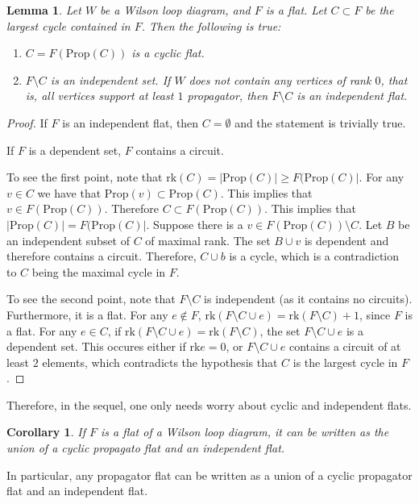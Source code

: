 \documentclass[11pt]{article}
\newcommand{\rk}{\textrm{rk}}
\newcommand{\Prop}{\textrm{Prop}}
\newtheorem{lem}[thm]{Lemma}
\newtheorem{cor}[thm]{Corollary}
\theoremstyle{remark}
\theoremstyle{definition}
\begin{document}
\begin{lem} Let $W$ be a Wilson loop diagram, and $F$ is a flat. Let $C \subset F$ be the largest cycle contained in $F$. Then the following is true:
\begin{enumerate}
\item $C = F(\Prop (C))$ is a cyclic flat.
\item $F \setminus C$ is an independent set. If $W$ does not contain any vertices of rank $0$, that is, all vertices support at least $1$ propagator, then $F \setminus C$ is an independent flat.
\end{enumerate}
\end{lem}

\begin{proof}
If $F$ is an independent flat, then $C = \emptyset$ and the statement is trivially true.

If $F$ is a dependent set, $F$ contains a circuit.

To see the first point, note that $\rk(C) = |\Prop(C)| \geq F(\Prop (C)|$.  For any $v\in C$ we have that $\Prop(v) \subset \Prop(C)$. This implies that $v \in F(\Prop(C))$. Therefore $C \subset F(\Prop(C))$. This implies that $|\Prop(C)| = F(\Prop (C)|$. Suppose there is a $v \in  F(\Prop(C)) \setminus C$. Let $B$ be an independent subset of $C$ of maximal rank. The set $B \cup v$ is dependent and therefore contains a circuit. Therefore, $C \cup b$ is a cycle, which is a contradiction to $C$ being the maximal cycle in $F$.

To see the second point, note that $F \setminus C$ is independent (as it contains no circuits). Furthermore, it is a flat. For any $e \not \in F$, $\rk (F \setminus C \cup e) = \rk (F\setminus C) +1$, since $F$ is a flat. For any $e \in C$,  if $\rk (F \setminus C \cup e) = \rk (F\setminus C)$, the set $F \setminus C \cup e$ is a dependent set. This occures either if $\rk{e} = 0$, or $F\setminus C \cup e$ contains a circuit of at least $2$ elements, which contradicts the hypothesis that $C$ is the largest cycle in $F$.
\end{proof}

Therefore, in the sequel, one only needs worry about cyclic and independent flats.

\begin{cor} \label{classifyflats}
If $F$ is a flat of a Wilson loop diagram, it can be written as the union of a cyclic propagato flat and an independent flat. \end{cor}

In particular, any propagator flat can be written as a union of a cyclic propagator flat and an independent flat.
\end{document}
